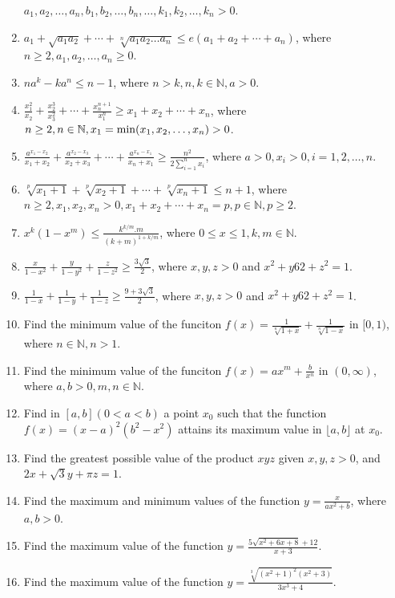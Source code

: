 \begin{enumerate}
  $a_1, a_2,\ldots, a_n, b_1, b_2, \ldots, b_n, \ldots, k_1, k_2, \ldots, k_n > 0$.
\item $a_1 + \sqrt{a_1a_2} + \cdots + \sqrt[n]{a_1a_2\ldots a_n}\leq e(a_1 + a_2 + \cdots + a_n)$, where $n\geq 2, a_1, a_2,
  \ldots, a_n\geq 0$.
\item $na^k - ka^n\leq n - 1$, where $n > k, n, k\in\mathbb{N}, a > 0$.
\item $\frac{x_1^2}{x_2} + \frac{x_2^3}{x_3^2} + \cdots + \frac{x_n^{n + 1}}{x_1^n}\geq x_1 + x_2 + \cdots + x_n$, where $n\geq 2,
  n\in\mathbb{N}, x_1 = {\rm min}(x_1, x_2, \ldots, x_n) > 0$.
\item $\frac{a^{x_1 - x_2}}{x_1 + x_2} + \frac{a^{x_2 - x_3}}{x_2 + x_3} + \cdots + \frac{a^{x_n - x_1}}{x_n +
  x_1}\geq \frac{n^2}{2\displaystyle\sum_{i=1}^nx_i}$, where $a > 0, x_i > 0, i = 1, 2, \ldots, n$.
\item $\sqrt[p]{x_1 + 1} + \sqrt[p]{x_2 + 1} + \cdots + \sqrt[p]{x_n + 1}\leq n + 1$, where $n\geq 2, x_1, x_2, x_n > 0, x_1 + x_2
  + \cdots + x_n = p, p\in\mathbb{N}, p\geq 2$.
\item $x^k(1 - x^m)\leq \frac{k^{k/m}.m}{(k + m)^{1 + k/m}}$, where $0\leq x\leq 1, k, m\in\mathbb{N}$.
\item $\frac{x}{1 - x^2} + \frac{y}{1 - y^2} + \frac{z}{1 - z^2}\geq \frac{3\sqrt{3}}{2}$, where $x, y, z > 0$ and $x^2 + y62 + z^2
  = 1$.
\item $\frac{1}{1 - x} + \frac{1}{1 - y} + \frac{1}{1 - z}\geq \frac{9 + 3\sqrt{3}}{2}$, where $x, y, z > 0$ and $x^2 + y62 + z^2
  = 1$.
\item Find the minimum value of the funciton $f(x) = \frac{1}{\sqrt[n]{1 + x}} + \frac{1}{\sqrt[n]{1 - x}}$ in $[0, 1)$, where
  $n\in\mathbb{N}, n > 1$.
\item Find the minimum value of the funciton $f(x) = ax^m + \frac{b}{x^n}$ in $(0, \infty)$, where $a, b > 0, m, n\in\mathbb{N}$.
\item Find in $[a, b] (0 < a < b)$ a point $x_0$ such that the function $f(x) = (x - a)^2(b^2 - x^2)$ attains its maximum value in
  $\lfloor a, b\rfloor$ at $x_0$.
\item Find the greatest possible value of the product $xyz$ given $x, y, z > 0$, and $2x + \sqrt{3}y + \pi z = 1$.
\item Find the maximum and minimum values of the function $y = \frac{x}{ax^2 + b}$, where $a, b > 0$.
\item Find the maximum value of the function $y = \frac{5\sqrt{x^2 + 6x + 8} + 12}{x + 3}$.
\item Find the maximum value of the function $y = \frac{\sqrt[3]{(x^2 + 1)^2(x^2 + 3)}}{3x^3 + 4}$.

\end{enumerate}
